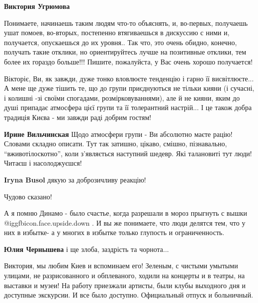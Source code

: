 \begin{itemize}
\begin{itemize}
\textbf{Виктория Угрюмова} 

Понимаете, начинаешь таким людям что-то объяснять, и, во-первых, получаешь ушат
помоев, во-вторых, постепенно втягиваешься в дискуссию с ними и, получается,
опускаешься до их уровня.. Так что, это очень обидно, конечно, получать такие
отклики, но ориентируйтесь лучше на позитивные отклики, тем более их гораздо
больше!!! Пишите, пожалуйста, у Вас очень хорошо получается!

\end{itemize} %


Вікторіє, Ви, як завжди, дуже тонко вловлюєте тенденцію і гарно її
висвітлюєте... А мене ще дуже тішить те, що до групи приєднуються не тільки
кияни (і сучасні, і колишні -зі своїми спогадами, розмірковуваннями), але й не
кияни, яким до душі припадає атмосфера цієї групи та її толерантний настрій... І
це також добра традиція Києва - ми завжди раді добрим гостям!

\begin{itemize} %
\textbf{Ирине Вильчинская} Щодо атмосфери групи - Ви абсолютно маєте рацію! Словами складно описати. Тут так затишно, цікаво, смішно, пізнавально, \enquote{вживотілоскотно}, коли з'являється наступний шедевр. Які талановиті тут люди! Читаєш і насолоджуєшся!

\textbf{Iryna Busol} дякую за доброзичливу реакцію!
\end{itemize} %

Чудово сказано!

А я помню Динамо - было счастье, когда разрешали в мороз прыгнуть с вышки  @igg{fbicon.face.upside.down} .
И вы же понимаете, что люди делятся тем, что у них в избытке- а у многих в избытке только глупость и ограниченность.

\begin{itemize} %
\textbf{Юлия Чернышева} і ще злоба, заздрість та чорнота...
\end{itemize} %


Виктория, мы любим Киев и вспоминаем его! Зеленым, с чистыми умытыми улицами,
не разрисованного и обплеваного, ходили на концерты и в театры, на выставки и
музеи! На работу приезжали артисты, были клубы выходного дня и доступные
экскурсии. И все было доступно. Официальный отпуск и больничный. 


\end{itemize}
